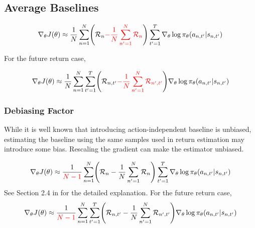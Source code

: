 \documentclass{article}
\begin{document}
\subsection{Average Baselines}

\begin{eqnarray}
\nabla_\theta J(\theta)
\approx \frac{1}{N} \sum_{n=1}^{N} \Biggl(\mathcal{R}_n {\color{red}{- \frac{1}{N} \sum_{n^\prime=1}^N \mathcal{R}_n }} \Biggr)\sum_{t^\prime=1}^{T} \nabla_\theta \log \pi_\theta (a_{n, t^\prime}|s_{n, t^\prime})
\end{eqnarray}

For the future return case,

\begin{eqnarray}
\nabla_\theta J(\theta)
\approx \frac{1}{N} \sum_{n=1}^{N} \sum_{t^\prime=1}^{T} \Biggl(\mathcal{R}_{n, t^\prime} {\color{red}{- \frac{1}{N} \sum_{n^\prime=1}^N \mathcal{R}_{n^\prime, t^\prime} }} \Biggr)  \nabla_\theta \log \pi_\theta (a_{n, t^\prime}|s_{n, t^\prime})
\end{eqnarray}

\subsubsection{Debiasing Factor}
While it is well known that introducing action-independent baseline is unbiased,
estimating the baseline using the same samples used in return estimation may introduce some bias.
Rescaling the gradient can make the estimator unbiased.

\begin{eqnarray}
\nabla_\theta J(\theta)
\approx \frac{1}{{\color{red}{N-1}}} \sum_{n=1}^{N} \Biggl(\mathcal{R}_n - \frac{1}{N} \sum_{n^\prime=1}^N \mathcal{R}_n \Biggr)\sum_{t^\prime=1}^{T} \nabla_\theta \log \pi_\theta (a_{n, t^\prime}|s_{n, t^\prime})
\end{eqnarray}
See Section 2.4 in \citet{Parmas2020-tr} for the detailed explanation.
For the future return case,
\begin{eqnarray}
\nabla_\theta J(\theta)
\approx \frac{1}{{\color{red}{N-1}}} \sum_{n=1}^{N} \sum_{t^\prime=1}^{T} \Biggl(\mathcal{R}_{n, t^\prime} - \frac{1}{N} \sum_{n^\prime=1}^N \mathcal{R}_{n^\prime, t^\prime} \Biggr)  \nabla_\theta \log \pi_\theta (a_{n, t^\prime}|s_{n, t^\prime})
\end{eqnarray}



\end{document}
